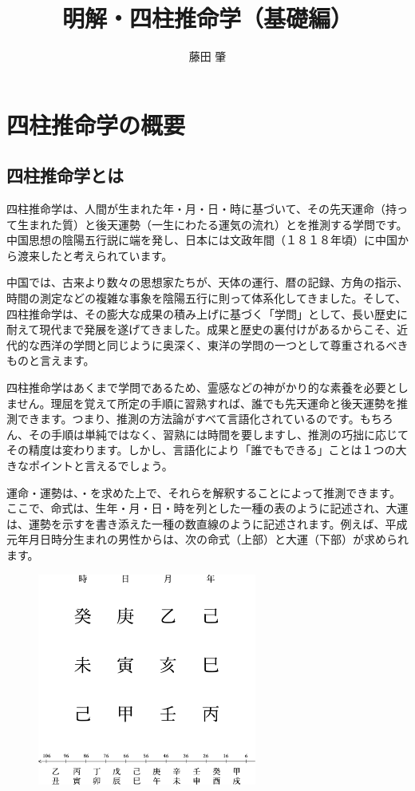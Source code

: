 \documentclass[a5paper,11pt,dvipdfmx]{tarticle}
\title{明解・四柱推命学（基礎編）}
\author{藤田 肇}
\begin{document}

\section{四柱推命学の概要}
\subsection{四柱推命学とは}

四柱推命学は、人間が生まれた年・月・日・時に基づいて、その先天運命（持って生まれた質）と後天運勢（一生にわたる運気の流れ）とを推測する学問です。中国思想の陰陽五行説に端を発し、日本には文政年間（１８１８年頃）に中国から渡来したと考えられています。

中国では、古来より数々の思想家たちが、天体の運行、暦の記録、方角の指示、時間の測定などの複雑な事象を陰陽五行に則って体系化してきました。そして、四柱推命学は、その膨大な成果の積み上げに基づく「学問」として、長い歴史に耐えて現代まで発展を遂げてきました。成果と歴史の裏付けがあるからこそ、近代的な西洋の学問と同じように奥深く、東洋の学問の一つとして尊重されるべきものと言えます。

四柱推命学はあくまで学問であるため、霊感などの神がかり的な素養を必要としません。理屈を覚えて所定の手順に習熟すれば、誰でも先天運命と後天運勢を推測できます。つまり、推測の方法論がすべて言語化されているのです。もちろん、その手順は単純ではなく、習熟には時間を要しますし、推測の巧拙に応じてその精度は変わります。しかし、言語化により「誰でもできる」ことは１つの大きなポイントと言えるでしょう。

運命・運勢は、・を求めた上で、それらを解釈することによって推測できます。ここで、命式は、生年・月・日・時を列とした一種の表のように記述され、大運は、運勢を示すを書き添えた一種の数直線のように記述されます。例えば、平成元年月日時分生まれの男性からは、次の命式（上部）と大運（下部）が求められます。

\begin{figure}
  \includegraphics[width=72mm,angle=90]{figs/fig1.eps}
\end{figure}
\end{document}
